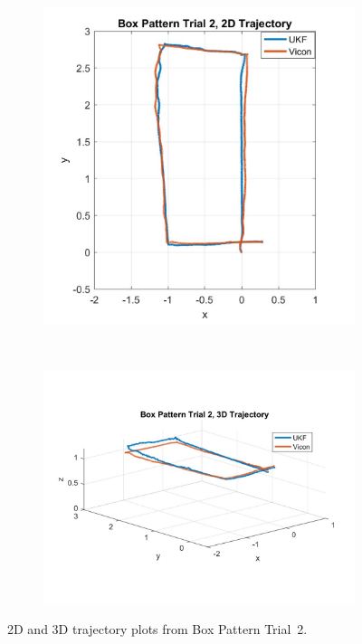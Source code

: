 \begin{figure}
    \centering
    \begin{subfigure}{0.4\textwidth}
        \includegraphics[width=\textwidth,left]{box2_2d}
    \end{subfigure}%
    ~ 
    \begin{subfigure}{0.6\textwidth}
        \centering
        \includegraphics[width=\textwidth,right]{box2_3d}
    \end{subfigure}
    \caption[Box Pattern Trial 2 Trajectory]{2D and 3D trajectory plots from Box Pattern Trial~2.}
    \label{box2_traj}
\end{figure}

